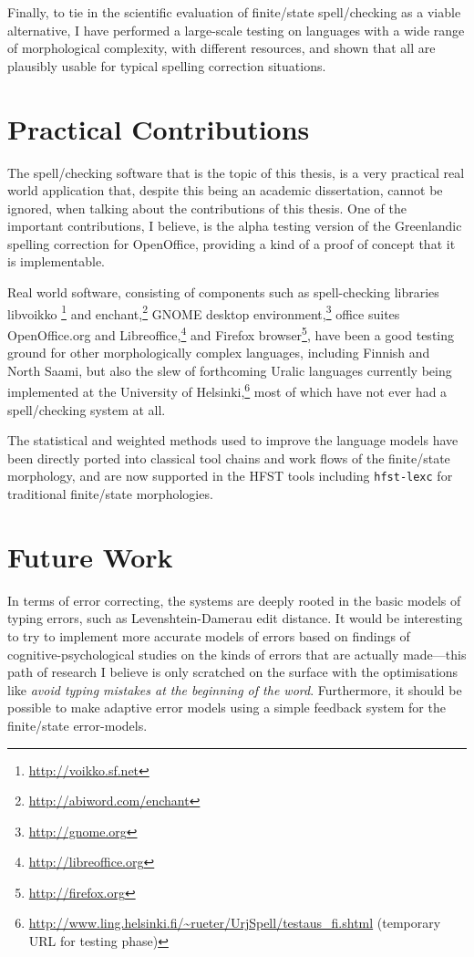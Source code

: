 \documentclass[officiallayout]{unihelcompling}
\begin{document}
Finally, to tie in the scientific evaluation of finite\-/state spell\-/checking
as a viable alternative, I have performed a large-scale testing on languages
with a wide range of morphological complexity, with different resources, and
shown that all are plausibly usable for typical spelling correction situations.


\section{Practical Contributions}
\label{sec:practical-contributions}

The spell\-/checking software that is the topic of this thesis, is a very
practical real world application that, despite this being an academic
dissertation, cannot be ignored, when talking about the contributions of this
thesis. One of the important contributions, I believe, is the alpha testing
version of the Greenlandic spelling correction for OpenOffice, providing a kind
of a proof of concept that it is implementable.

Real world software, consisting of components such as spell-checking libraries
libvoikko \footnote{\url{http://voikko.sf.net}} and
enchant,\footnote{\url{http://abiword.com/enchant}} GNOME desktop
environment,\footnote{\url{http://gnome.org}} office suites OpenOffice.org and
Libreoffice,\footnote{\url{http://libreoffice.org}} and Firefox
browser\footnote{\url{http://firefox.org}}, have been a good testing ground for
other morphologically complex languages, including Finnish and North Saami, but
also the slew of forthcoming Uralic languages currently being implemented at
the University of
Helsinki,\footnote{\url{http://www.ling.helsinki.fi/~rueter/UrjSpell/testaus_fi.shtml}
(temporary URL for testing phase)} most of which have not ever had a
spell\-/checking system at all. 

The statistical and weighted methods used to improve the language models have
been directly ported into classical tool chains and work flows of the 
finite\-/state morphology, and are now supported in the HFST tools including
\texttt{hfst-lexc} for traditional finite\-/state morphologies.

\section{Future Work}
\label{sec:future-work}

In terms of error correcting, the systems are deeply rooted in the basic models
of typing errors, such as Levenshtein-Damerau edit distance. It would be
interesting to try to implement more accurate models of errors based on
findings of cognitive-psychological studies on the kinds of errors that are
actually made---this path of research I believe is only scratched on the
surface with the optimisations like \emph{avoid typing mistakes at the
beginning of the word}. Furthermore, it should be possible to make adaptive
error models using a simple feedback system for the finite\-/state
error-models.
\end{document}
